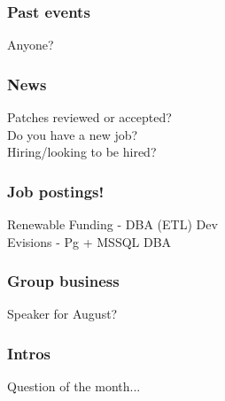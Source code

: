 \documentclass{beamer}
\begin{document}
\frame
{
  \frametitle{Past events}
  \begin{center}
Anyone?\\
  \end{center}
}

\frame
{
  \frametitle{News}
  \begin{center}
Patches reviewed or accepted?\\
Do you have a new job?\\
Hiring/looking to be hired?\\
  \end{center}
}

\frame
{
  \frametitle{Job postings!}
  \begin{center}
Renewable Funding - DBA (ETL) Dev\\
\vspace{5 mm}
Evisions - Pg + MSSQL DBA\\
\vspace{5 mm}
  \end{center}
}

\frame
{
  \frametitle{Group business}
  \begin{center}
Speaker for August?\\
  \end{center}
}

\frame
{
  \frametitle{Intros}
  \begin{center}
Question of the month...\\
  \end{center}
}
\end{document}
